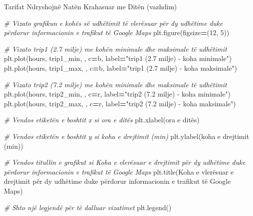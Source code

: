 \documentclass[
  ignorenonframetext,
]{beamer}
\newenvironment{Shaded}{\begin{snugshade}}{\end{snugshade}}
\newcommand{\CommentTok}[1]{\textcolor[rgb]{0.56,0.35,0.01}{\textit{#1}}}
\newcommand{\DecValTok}[1]{\textcolor[rgb]{0.00,0.00,0.81}{#1}}
\newcommand{\NormalTok}[1]{#1}
\newcommand{\OperatorTok}[1]{\textcolor[rgb]{0.81,0.36,0.00}{\textbf{#1}}}
\newcommand{\StringTok}[1]{\textcolor[rgb]{0.31,0.60,0.02}{#1}}
\begin{document}
\begin{frame}[fragile]{Tarifat Ndryshojnë Natën Krahasuar me Ditën
(vazhdim)}
\protect\hypertarget{tarifat-ndryshojnuxeb-natuxebn-krahasuar-me-dituxebn-vazhdim}{}

\begin{Shaded}
\begin{Highlighting}[]
\CommentTok{\# Vizato grafikun e kohës së udhëtimit të vlerësuar për dy udhëtime duke përdorur informacionin e trafikut të Google Maps}
\NormalTok{plt.figure(figsize}\OperatorTok{=}\NormalTok{(}\DecValTok{12}\NormalTok{, }\DecValTok{5}\NormalTok{))}

\CommentTok{\# Vizato trip1 (2.7 milje) me kohën minimale dhe maksimale të udhëtimit}
\NormalTok{plt.plot(hours, trip1\_min, }\StringTok{\textquotesingle{}{-}{-}\textquotesingle{}}\NormalTok{, c}\OperatorTok{=}\StringTok{\textquotesingle{}b\textquotesingle{}}\NormalTok{, label}\OperatorTok{=}\StringTok{"trip1 (2.7 milje) {-} koha minimale"}\NormalTok{)}
\NormalTok{plt.plot(hours, trip1\_max, }\StringTok{\textquotesingle{}{-}\textquotesingle{}}\NormalTok{, c}\OperatorTok{=}\StringTok{\textquotesingle{}b\textquotesingle{}}\NormalTok{, label}\OperatorTok{=}\StringTok{"trip1 (2.7 milje) {-} koha maksimale"}\NormalTok{)}

\CommentTok{\# Vizato trip2 (7.2 milje) me kohën minimale dhe maksimale të udhëtimit}
\NormalTok{plt.plot(hours, trip2\_min, }\StringTok{\textquotesingle{}{-}{-}\textquotesingle{}}\NormalTok{, c}\OperatorTok{=}\StringTok{\textquotesingle{}r\textquotesingle{}}\NormalTok{, label}\OperatorTok{=}\StringTok{"trip2 (7.2 milje) {-} koha minimale"}\NormalTok{)}
\NormalTok{plt.plot(hours, trip2\_max, }\StringTok{\textquotesingle{}{-}\textquotesingle{}}\NormalTok{, c}\OperatorTok{=}\StringTok{\textquotesingle{}r\textquotesingle{}}\NormalTok{, label}\OperatorTok{=}\StringTok{"trip2 (7.2 milje) {-} koha maksimale"}\NormalTok{)}

\CommentTok{\# Vendos etiketën e boshtit x si \textquotesingle{}ora e ditës\textquotesingle{}}
\NormalTok{plt.xlabel(}\StringTok{\textquotesingle{}ora e ditës\textquotesingle{}}\NormalTok{)}

\CommentTok{\# Vendos etiketën e boshtit y si \textquotesingle{}koha e drejtimit (min)\textquotesingle{}}
\NormalTok{plt.ylabel(}\StringTok{\textquotesingle{}koha e drejtimit (min)\textquotesingle{}}\NormalTok{)}

\CommentTok{\# Vendos titullin e grafikut si \textquotesingle{}Koha e vlerësuar e drejtimit për dy udhëtime duke përdorur informacionin e trafikut të Google Maps\textquotesingle{}}
\NormalTok{plt.title(}\StringTok{\textquotesingle{}Koha e vlerësuar e drejtimit për dy udhëtime duke përdorur informacionin e trafikut të Google Maps\textquotesingle{}}\NormalTok{)}

\CommentTok{\# Shto një legjendë për të dalluar vizatimet}
\NormalTok{plt.legend()}
\end{Highlighting}
\end{Shaded}
\end{frame}
\end{document}
